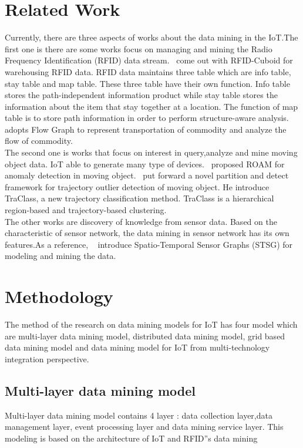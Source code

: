 \documentclass[a4paper,12pt]{article}
\begin{document}
{\section{Related Work}
Currently, there are three aspects of works about the data mining in the IoT.The first one is there are some works focus on managing and mining the Radio Frequency Identification (RFID) data stream.~\cite{Hector4} come out with RFID-Cuboid for warehousing RFID data. RFID data maintains three table which are info table, stay table and map table. These three table have their own function. Info table stores the path-independent information product while stay table stores the information about the item that stay together at a location. The function of map table is to store path information in order to perform structure-aware analysis.~\cite{Hector5} adopts Flow Graph to represent transportation of commodity and analyze the flow of commodity.\\
\indent
The second one is works that focus on interest in query,analyze and mine moving object data. IoT able to generate many type of devices.~\cite{Li7} proposed ROAM for anomaly detection in moving object.~\cite{Lee10} put forward a novel partition and detect framework for trajectory outlier detection of moving object. He introduce TraClass, a new trajectory classification method. TraClass is a hierarchical region-based and trajectory-based clustering.\\
\indent
The other works are discovery of knowledge from sensor data. Based on the characteristic of sensor network, the data mining in sensor network has its own features.As a reference, ~\cite{Betsy13} introduce Spatio-Temporal Sensor Graphs (STSG) for modeling and mining the data.
\section{Methodology}
The method of the research on data mining models for IoT has four model which are multi-layer data mining model, distributed data mining model, grid based data mining model and data mining model for IoT from multi-technology integration perspective.
\subsection{Multi-layer data mining model}
Multi-layer data mining model contains 4 layer : data collection layer,data management layer, event processing layer and data mining service layer. This modeling is based on the architecture of IoT and RFID''s data mining
}
\end{document}
